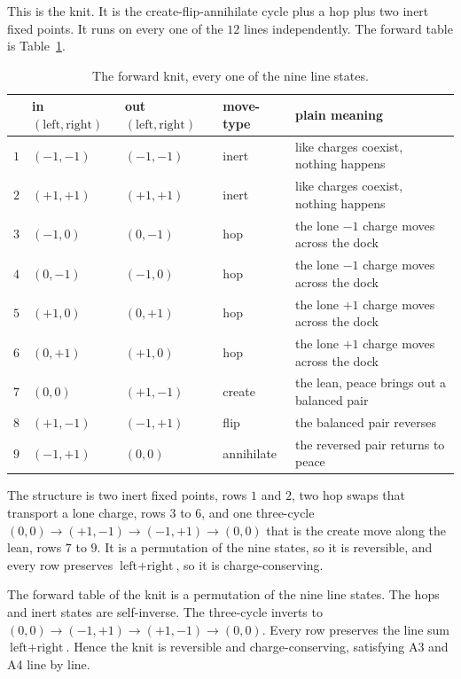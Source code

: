 This is the knit. It is the create-flip-annihilate cycle plus a hop plus two inert fixed points. It runs on every one of the $12$ lines independently. The forward table is Table~\ref{tab:forward}.

\begin{table}[ht]
\centering
\begin{tabular}{@{}lllll@{}}
\toprule
 & in $(\text{left}, \text{right})$ & out $(\text{left}, \text{right})$ & move-type & plain meaning \\
\midrule
$1$ & $(-1,-1)$ & $(-1,-1)$ & inert & like charges coexist, nothing happens \\
$2$ & $(+1,+1)$ & $(+1,+1)$ & inert & like charges coexist, nothing happens \\
$3$ & $(-1,0)$ & $(0,-1)$ & hop & the lone $-1$ charge moves across the dock \\
$4$ & $(0,-1)$ & $(-1,0)$ & hop & the lone $-1$ charge moves across the dock \\
$5$ & $(+1,0)$ & $(0,+1)$ & hop & the lone $+1$ charge moves across the dock \\
$6$ & $(0,+1)$ & $(+1,0)$ & hop & the lone $+1$ charge moves across the dock \\
$7$ & $(0,0)$ & $(+1,-1)$ & create & the lean, peace brings out a balanced pair \\
$8$ & $(+1,-1)$ & $(-1,+1)$ & flip & the balanced pair reverses \\
$9$ & $(-1,+1)$ & $(0,0)$ & annihilate & the reversed pair returns to peace \\
\bottomrule
\end{tabular}
\caption{The forward knit, every one of the nine line states.}
\label{tab:forward}
\end{table}

The structure is two inert fixed points, rows $1$ and $2$, two hop swaps that transport a lone charge, rows $3$ to $6$, and one three-cycle $(0,0) \to (+1,-1) \to (-1,+1) \to (0,0)$ that is the create move along the lean, rows $7$ to $9$. It is a permutation of the nine states, so it is reversible, and every row preserves $\text{left} + \text{right}$, so it is charge-conserving.

\begin{theorem}
The forward table of the knit is a permutation of the nine line states. The hops and inert states are self-inverse. The three-cycle inverts to $(0,0) \to (-1,+1) \to (+1,-1) \to (0,0)$. Every row preserves the line sum $\text{left} + \text{right}$. Hence the knit is reversible and charge-conserving, satisfying A3 and A4 line by line.
\end{theorem}

